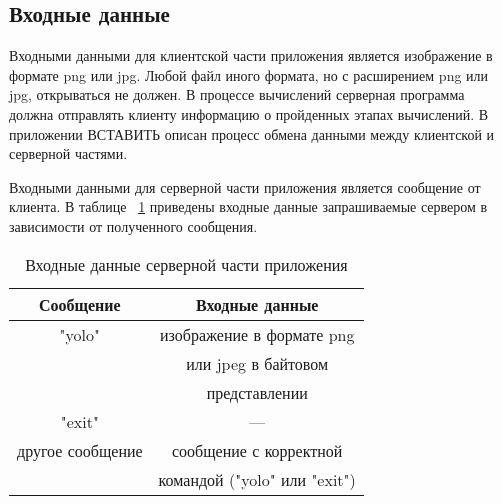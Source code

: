 \documentclass[a4paper,english]{G2-105}
\begin{document}
\subsection{Входные данные}
\par Входными данными для клиентской части приложения является изображение в формате png или jpg. Любой файл иного формата, но с расширением png или jpg, открываться не должен. В процессе вычислений серверная программа должна отправлять клиенту информацию о пройденных этапах вычислений. В приложении ВСТАВИТЬ описан процесс обмена данными между клиентской и серверной частями.
\par Входными данными для серверной части приложения является сообщение от клиента. В таблице ~\ref{input} приведены входные данные запрашиваемые сервером в зависимости от полученного сообщения.
\begin{longtable}{|c|c|}
    \caption{Входные данные серверной части приложения} \label{input} \\ \hline
    Сообщение        & Входные данные            \\ \hline \endhead
    "yolo"           & изображение в формате png \\ 
                     & или jpeg в байтовом       \\
                     & представлении             \\ \hline
    "exit"           & ---                       \\ \hline
    другое сообщение & сообщение с корректной    \\  
    	                 & командой ("yolo" или "exit") \\
\end{longtable}
\end{document}
